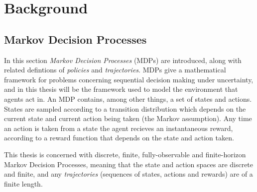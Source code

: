 

\chapter{\label{ch:2-background}Background}

    \minitoc









    


\section{Markov Decision Processes}
\label{sec:2-1-mdps}


    In this section \textit{Markov Decision Processes} (MDPs) are introduced, along with related defintions of \textit{policies} and \textit{trajectories}. MDPs give a mathematical framework for problems concerning sequential decision making under uncertainty, and in this thesis will be the framework used to model the environment that agents act in. An MDP contains, among other things, a set of states and actions. States are sampled according to a transition distribution which depends on the current state and current action being taken (the Markov assumption). Any time an action is taken from a state the agent recieves an instantaneous reward, according to a reward function that depends on the state and action taken.

    This thesis is concerned with discrete, finite, fully-observable and finite-horizon Markov Decision Processes, meaning that the state and action spaces are discrete and finite, and any \textit{trajectories} (sequences of states, actions and rewards) are of a finite length. 

